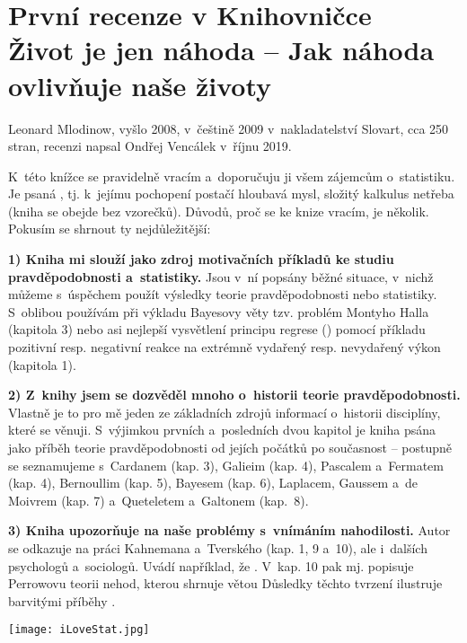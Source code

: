 \newpage

\section*{První recenze v Knihovničce\\Život je jen náhoda -- Jak náhoda ovlivňuje naše životy}
\smallskip

Leonard Mlodinow, vyšlo 2008, v~češtině 2009 v~nakladatelství Slovart, cca 250 stran, recenzi napsal Ondřej Vencálek v~říjnu 2019.


K~této knížce se pravidelně vracím a~doporučuju ji všem zájemcům o~statistiku. Je psaná , tj. k~jejímu pochopení postačí hloubavá mysl, složitý kalkulus netřeba (kniha se obejde bez vzorečků). Důvodů, proč se ke knize vracím, je několik. Pokusím se shrnout ty nejdůležitější:%

\textbf{1) Kniha mi slouží jako zdroj motivačních příkladů ke studiu pravděpodobnosti a~statistiky.} 
%
Jsou v~ní popsány běžné situace, v~nichž můžeme s~úspěchem použít výsledky teorie pravděpodobnosti nebo statistiky. S~oblibou používám při výkladu Bayesovy věty tzv. problém Montyho Halla (kapitola 3) nebo asi nejlepší vysvětlení principu regrese () pomocí příkladu pozitivní resp. negativní reakce na extrémně vydařený resp. nevydařený výkon (kapitola 1).%

\textbf{2) Z~knihy jsem se dozvěděl mnoho o~historii teorie pravděpodobnosti.} 
%
Vlastně je to pro mě jeden ze základních zdrojů informací o~historii disciplíny, které se věnuji. S~výjimkou prvních a~posledních dvou kapitol je kniha psána jako příběh teorie pravděpodobnosti od jejích počátků po současnost – postupně se seznamujeme s~Cardanem (kap. 3), Galieim (kap. 4), Pascalem a~Fermatem (kap. 4), Bernoullim (kap. 5), Bayesem (kap. 6), Laplacem, Gaussem a~de Moivrem (kap. 7) a~Queteletem a~Galtonem (kap.~8).%

\textbf{3) Kniha upozorňuje na naše problémy s~vnímáním nahodilosti.} 
%
Autor se odkazuje na práci Kahnemana a~Tverského (kap. 1, 9 a~10), ale i~dalších psychologů a~sociologů. Uvádí například, že . V~kap. 10 pak mj. popisuje Perrowovu teorii nehod, kterou shrnuje větou  Důsledky těchto tvrzení ilustruje barvitými příběhy .

\enlargethispage{\baselineskip}

\noindent
\texttt{[image: iLoveStat.jpg]}


